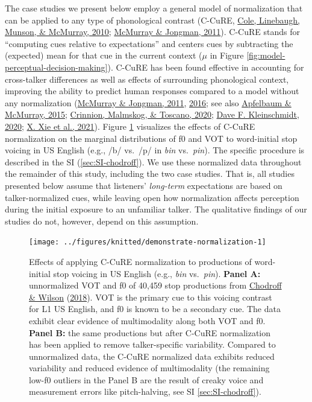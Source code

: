 \documentclass[
  11pt,
  english,
  man,floatsintext]{apa6}
\begin{document}
The case studies we present below employ a general model of normalization that can be applied to any type of phonological contrast (C-CuRE, \protect\hyperlink{ref-cole2010}{Cole, Linebaugh, Munson, \& McMurray, 2010}; \protect\hyperlink{ref-mcmurray-jongman2011}{McMurray \& Jongman, 2011}). C-CuRE stands for ``computing cues relative to expectations'' and centers cues by subtracting the (expected) mean for that cue in the current context (\(\mu\) in Figure \ref{fig:model-perceptual-decision-making}). C-CuRE has been found effective in accounting for cross-talker differences as well as effects of surrounding phonological context, improving the ability to predict human responses compared to a model without any normalization (\protect\hyperlink{ref-mcmurray-jongman2011}{McMurray \& Jongman, 2011}, \protect\hyperlink{ref-mcmurray-jongman2016}{2016}; see also \protect\hyperlink{ref-apfelbaum-mcmurray2015}{Apfelbaum \& McMurray, 2015}; \protect\hyperlink{ref-crinnion2020}{Crinnion, Malmskog, \& Toscano, 2020}; \protect\hyperlink{ref-kleinschmidt2020}{Dave F. Kleinschmidt, 2020}; \protect\hyperlink{ref-xie2021cognition}{X. Xie et al., 2021}). Figure \ref{fig:demonstrate-normalization} visualizes the effects of C-CuRE normalization on the marginal distributions of f0 and VOT to word-initial stop voicing in US English (e.g., /b/ vs.~/p/ in \emph{bin} vs.~\emph{pin}). The specific procedure is described in the SI (\ref{sec:SI-chodroff}). We use these normalized data throughout the remainder of this study, including the two case studies. That is, all studies presented below assume that listeners' \emph{long-term} expectations are based on talker-normalized cues, while leaving open how normalization affects perception during the initial exposure to an unfamiliar talker. The qualitative findings of our studies do not, however, depend on this assumption.



\begin{figure}

{\centering \texttt{[image: ../figures/knitted/demonstrate-normalization-1]} 

}

\caption{Effects of applying C-CuRE normalization to productions of word-initial stop voicing in US English (e.g., \emph{bin} vs.~\emph{pin}). \textbf{Panel A:} unnormalized VOT and f0 of 40,459 stop productions from \protect\hyperlink{ref-chodroff-wilson2018}{Chodroff \& Wilson} (\protect\hyperlink{ref-chodroff-wilson2018}{2018}). VOT is the primary cue to this voicing contrast for L1 US English, and f0 is known to be a secondary cue. The data exhibit clear evidence of multimodality along both VOT and f0. \textbf{Panel B:} the same productions but after C-CuRE normalization has been applied to remove talker-specific variability. Compared to unnormalized data, the C-CuRE normalized data exhibits reduced variability and reduced evidence of multimodality (the remaining low-f0 outliers in the Panel B are the result of creaky voice and measurement errors like pitch-halving, see SI \ref{sec:SI-chodroff}).}\label{fig:demonstrate-normalization}
\end{figure}
\end{document}
